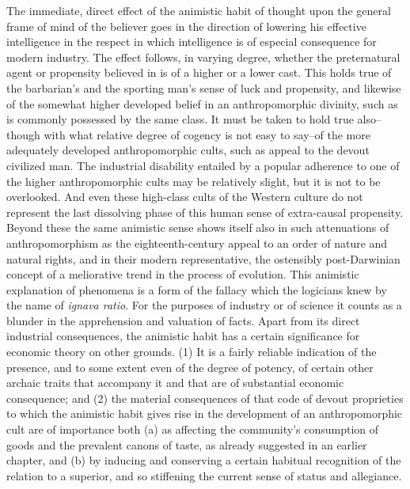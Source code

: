 \documentclass[12pt]{report}
\begin{document}
The immediate, direct effect of the animistic habit of thought upon the
general frame of mind of the believer goes in the direction of lowering
his effective intelligence in the respect in which intelligence is of
especial consequence for modern industry. The effect follows, in varying
degree, whether the preternatural agent or propensity believed in is
of a higher or a lower cast. This holds true of the barbarian's and
the sporting man's sense of luck and propensity, and likewise of the
somewhat higher developed belief in an anthropomorphic divinity, such as
is commonly possessed by the same class. It must be taken to hold true
also--though with what relative degree of cogency is not easy to say--of
the more adequately developed anthropomorphic cults, such as appeal
to the devout civilized man. The industrial disability entailed by a
popular adherence to one of the higher anthropomorphic cults may be
relatively slight, but it is not to be overlooked. And even these
high-class cults of the Western culture do not represent the last
dissolving phase of this human sense of extra-causal propensity. Beyond
these the same animistic sense shows itself also in such attenuations of
anthropomorphism as the eighteenth-century appeal to an order of nature
and natural rights, and in their modern representative, the ostensibly
post-Darwinian concept of a meliorative trend in the process of
evolution. This animistic explanation of phenomena is a form of the
fallacy which the logicians knew by the name of \emph{ignava ratio}. For
the purposes of industry or of science it counts as a blunder in the
apprehension and valuation of facts. Apart from its direct industrial
consequences, the animistic habit has a certain significance for
economic theory on other grounds. (1) It is a fairly reliable indication
of the presence, and to some extent even of the degree of potency,
of certain other archaic traits that accompany it and that are of
substantial economic consequence; and (2) the material consequences of
that code of devout proprieties to which the animistic habit gives rise
in the development of an anthropomorphic cult are of importance both
(a) as affecting the community's consumption of goods and the prevalent
canons of taste, as already suggested in an earlier chapter, and (b) by
inducing and conserving a certain habitual recognition of the relation
to a superior, and so stiffening the current sense of status and
allegiance.
\end{document}
